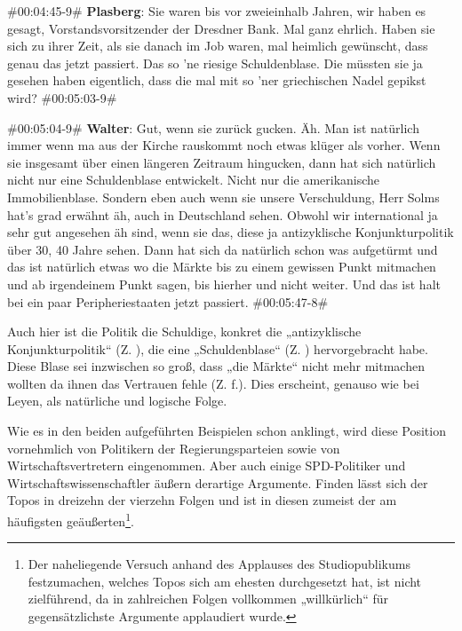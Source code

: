 \begin{description}
	\begin{linenumbers}[1]
		\item \#00:04:45-9\# \textbf{Plasberg}: Sie waren bis vor zweieinhalb Jahren, wir haben es gesagt, Vorstandsvorsitzender der Dresdner Bank. Mal ganz ehrlich. Haben sie sich zu ihrer Zeit, als sie danach im Job waren, mal heimlich gewünscht, dass genau das jetzt passiert. Das so 'ne riesige Schuldenblase. Die müssten sie ja gesehen haben eigentlich, dass die mal mit so 'ner griechischen Nadel gepikst wird? \#00:05:03-9\#
		
		\item \#00:05:04-9\# \textbf{Walter}: Gut, wenn sie zurück gucken. Äh. Man ist natürlich immer wenn ma aus der Kirche rauskommt noch etwas klüger als vorher. Wenn sie insgesamt über einen längeren Zeitraum hingucken, dann hat sich natürlich nicht nur eine Schuldenblase entwickelt. Nicht nur die amerikanische Immobilienblase. Sondern eben auch wenn sie unsere Verschuldung, Herr Solms hat's grad erwähnt äh, auch in Deutschland sehen. Obwohl wir international ja sehr gut angesehen äh sind, wenn sie das, diese ja antizyklische Konjunkturpolitik über 30, 40 Jahre sehen. Dann hat sich da natürlich schon was aufgetürmt und das ist natürlich etwas wo die Märkte bis zu einem gewissen Punkt mitmachen und ab irgendeinem Punkt sagen, bis hierher und nicht weiter. Und das ist halt bei ein paar Peripheriestaaten jetzt passiert. \#00:05:47-8\#
	\end{linenumbers}
\end{description}

Auch hier ist die Politik die Schuldige, konkret die „antizyklische Konjunkturpolitik“ (Z. ), die eine „Schuldenblase“ (Z. ) hervorgebracht habe. Diese Blase sei inzwischen so groß, dass „die Märkte“ nicht mehr mitmachen wollten da ihnen das Vertrauen fehle (Z. f.). Dies erscheint, genauso wie bei Leyen, als natürliche und logische Folge.

Wie es in den beiden aufgeführten Beispielen schon anklingt, wird diese Position vornehmlich von Politikern der Regierungsparteien sowie von Wirtschaftsvertretern eingenommen. Aber auch einige SPD-Politiker und Wirtschaftswissenschaftler äußern derartige Argumente. Finden lässt sich der Topos in dreizehn der vierzehn Folgen und ist in diesen zumeist der am häufigsten geäußerten\footnote{Der naheliegende Versuch anhand des Applauses des Studiopublikums festzumachen, welches Topos sich am ehesten durchgesetzt hat, ist nicht zielführend, da in zahlreichen Folgen vollkommen „willkürlich“ für gegensätzlichste Argumente applaudiert wurde.}.

